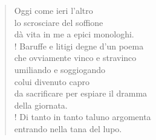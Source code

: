 
\begin{verse}
    Oggi come ieri l'altro\\
    lo scrosciare del soffione\\
    dà vita in me a epici monologhi.\\!
    Baruffe e litigi degne d'un poema\\

    che ovviamente vinco e stravinco\\
    umiliando e soggiogando\\
    colui divenuto capro\\
    da sacrificare per espiare il dramma\\
    della giornata.\\!
    Di tanto in tanto taluno argomenta\\
    entrando nella tana del lupo.
\end{verse}